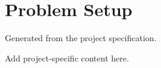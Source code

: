 \section{Problem Setup}
Generated from the project specification.

Add project-specific content here.
